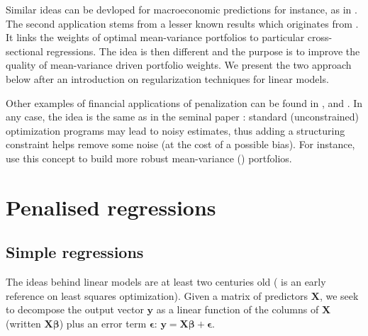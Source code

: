 \documentclass[]{krantz}
\theoremstyle{definition}
\theoremstyle{definition}
\theoremstyle{definition}
\theoremstyle{remark}
\begin{document}
Similar ideas can be devloped for macroeconomic predictions for
instance, as in \citet{uematsu2019high}. The second application stems
from a lesser known results which originates from
\citet{stevens1998inverse}. It links the weights of optimal
mean-variance portfolios to particular cross-sectional regressions. The
idea is then different and the purpose is to improve the quality of
mean-variance driven portfolio weights. We present the two approach
below after an introduction on regularization techniques for linear
models.

Other examples of financial applications of penalization can be found in
\citet{d2011identifying}, \citet{ban2016machine} and
\citet{kremer2019sparse}. In any case, the idea is the same as in the
seminal paper \citet{tibshirani1996regression}: standard (unconstrained)
optimization programs may lead to noisy estimates, thus adding a
structuring constraint helps remove some noise (at the cost of a
possible bias). For instance, \citet{kremer2019sparse} use this concept
to build more robust mean-variance (\citet{markowitz1952portfolio})
portfolios.

\hypertarget{penalised-regressions}{%
\section{Penalised regressions}\label{penalised-regressions}}

\hypertarget{simple-regressions}{%
\subsection{Simple regressions}\label{simple-regressions}}

The ideas behind linear models are at least two centuries old
(\citet{legendre1805nouvelles} is an early reference on least squares
optimization). Given a matrix of predictors \(\textbf{X}\), we seek to
decompose the output vector \(\textbf{y}\) as a linear function of the
columns of \(\textbf{X}\) (written \(\textbf{X}\boldsymbol{\beta}\))
plus an error term \(\boldsymbol{\epsilon}\):
\(\textbf{y}=\textbf{X}\boldsymbol{\beta}+\boldsymbol{\epsilon}\).
\end{document}
